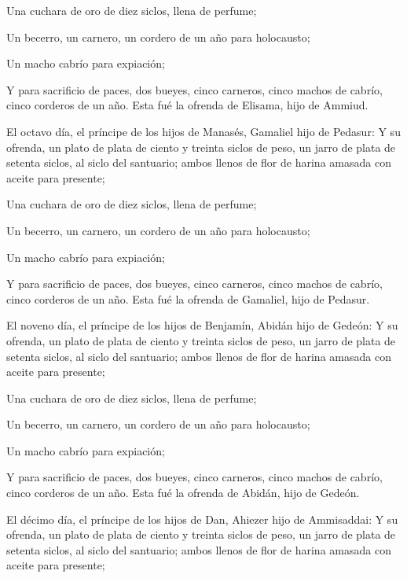  Una cuchara de oro de diez siclos, llena de perfume;

 Un becerro, un carnero, un cordero de un año para
holocausto;

 Un macho cabrío para expiación;

 Y para sacrificio de paces, dos bueyes, cinco carneros,
cinco machos de cabrío, cinco corderos de un año. Esta fué la ofrenda de
Elisama, hijo de Ammiud.

 El octavo día, el príncipe de los hijos de Manasés,
Gamaliel hijo de Pedasur:  Y su ofrenda, un plato de
plata de ciento y treinta siclos de peso, un jarro de plata de setenta
siclos, al siclo del santuario; ambos llenos de flor de harina amasada
con aceite para presente;

 Una cuchara de oro de diez siclos, llena de perfume;

 Un becerro, un carnero, un cordero de un año para
holocausto;

 Un macho cabrío para expiación;

 Y para sacrificio de paces, dos bueyes, cinco carneros,
cinco machos de cabrío, cinco corderos de un año. Esta fué la ofrenda de
Gamaliel, hijo de Pedasur.

 El noveno día, el príncipe de los hijos de Benjamín,
Abidán hijo de Gedeón:  Y su ofrenda, un plato de plata
de ciento y treinta siclos de peso, un jarro de plata de setenta siclos,
al siclo del santuario; ambos llenos de flor de harina amasada con
aceite para presente;

 Una cuchara de oro de diez siclos, llena de perfume;

 Un becerro, un carnero, un cordero de un año para
holocausto;

 Un macho cabrío para expiación;

 Y para sacrificio de paces, dos bueyes, cinco carneros,
cinco machos de cabrío, cinco corderos de un año. Esta fué la ofrenda de
Abidán, hijo de Gedeón.

 El décimo día, el príncipe de los hijos de Dan, Ahiezer
hijo de Ammisaddai:  Y su ofrenda, un plato de plata de
ciento y treinta siclos de peso, un jarro de plata de setenta siclos, al
siclo del santuario; ambos llenos de flor de harina amasada con aceite
para presente;

